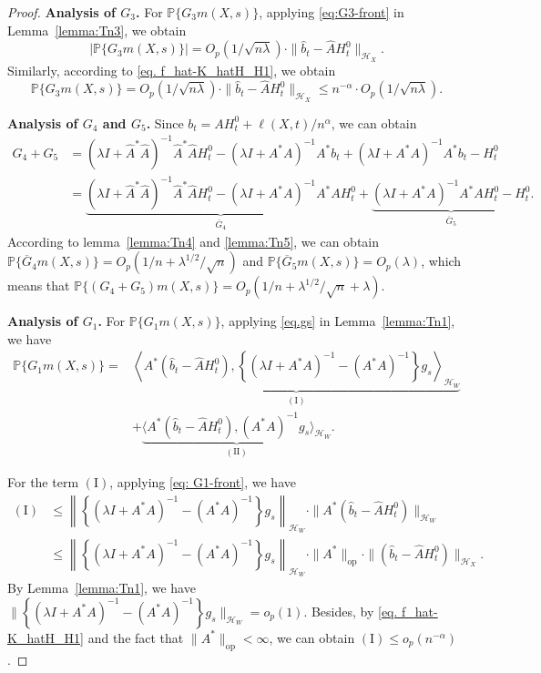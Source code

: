 \documentclass[
  12pt]{article}
\def\mP{\mathbb{P}}
\def\cH{\mathcal{H}}
\begin{document}
\begin{proof}
\textbf{Analysis of $G_3$.} For $\mP\{G_3m(X,s)\}$, applying \eqref{eq:G3-front} in Lemma~\ref{lemma:Tn3}, we obtain
$$
|\mP\{G_3m(X,s)\}|=O_p(1/\sqrt{n\lambda})\cdot \| \widehat{b}_t-\widehat{A}H^0_t\|_{\mathcal{H}_X}.
$$
Similarly, according to \eqref{eq. f_hat-K_hatH_H1}, we obtain
$$
\mP\{G_3m(X,s)\}
= O_p(1/\sqrt{n\lambda})\cdot \| \widehat{b}_t-\widehat{A}H^0_t\|_{\mathcal{H}_X}  \le    n^{-\alpha}\cdot O_p(1/\sqrt{n\lambda}).
$$

\textbf{Analysis of $G_4$ and $G_5$.} Since $b_t=AH^0_t+\ell(X,t)/n^{\alpha}$, we can obtain
\begin{align*}
	G_4+G_5
	&= (\lambda I+\widehat{A}^*\widehat{A})^{-1}\widehat{A}^*\widehat{A}H_{t}^{0}-(\lambda I+A^*A)^{-1}A^*b_t+(\lambda I+A^*A)^{-1}A^*b_t-H_{t}^{0} \\
	&= \underbrace{(\lambda I+\widehat{A}^*\widehat{A})^{-1}\widehat{A}^*\widehat{A}H_{t}^{0}-(\lambda I+A^*A)^{-1}A^*AH_{t}^{0}}_{\overline{G}_4}+ \underbrace{(\lambda I+A^*A)^{-1}A^*AH_{t}^{0}-H_{t}^{0}}_{\overline{G}_5}.
\end{align*}
According to lemma~\ref{lemma:Tn4} and \ref{lemma:Tn5}, we can obtain $\mP\{\overline{G}_4m(X,s)\}=O_{p}(1/n+\lambda^{1/2}/\sqrt{n})$ and $\mP\{\overline{G}_5m(X,s)\}=O_p(\lambda)$, which means that $\mP\{(G_4+G_5)m(X,s)\}=O_{p}(1/n+\lambda^{1/2}/\sqrt{n}+\lambda)$.

\textbf{Analysis of $G_1$.} For $\mP\{G_1m(X,s)\}$, applying \eqref{eq.gs} in Lemma~\ref{lemma:Tn1}, we have
\begin{align*}
	\mP\{G_1m(X,s)\}=& \underbrace{\left\langle A^*(\widehat{b}_t-\widehat{A}H_{t}^{0}),\left\{ (\lambda I+A^*A)^{-1}-(A^*A)^{-1} \right\} g_s \right\rangle_{\cH_W}}_{(\mathrm{I})} \\
    &+ \underbrace{\langle A^*(\widehat{b}_t-\widehat{A}H_{t}^{0}),(A^*A)^{-1}g_s \rangle_{\cH_W}}_{(\mathrm{II})}.
\end{align*}

For the term $\mathrm{(I)}$, applying \eqref{eq: G1-front}, we have
\begin{align*}
    \mathrm{(I)}&\le \left\| \left\{ (\lambda I+A^*A)^{-1}-(A^*A)^{-1} \right\} g_s \right\|_{\mathcal{H}_W} \cdot  \| A^*(\widehat{b}_t-\widehat{A}H^0_t)\|_{\mathcal{H}_W}\\
    & \le \left\| \left\{ (\lambda I+A^*A)^{-1}-(A^*A)^{-1} \right\} g_s \right\|_{\mathcal{H}_W} \cdot  \| A^*\|_{\mathrm{op}}\cdot\|(\widehat{b}_t-\widehat{A}H^0_t)\|_{\mathcal{H}_X}.
\end{align*}
By 
Lemma~\ref{lemma:Tn1}, we have $\| \left\{ (\lambda I+A^*A)^{-1}-(A^*A)^{-1} \right\} g_s \|_{\cH_W}=o_p(1)$. Besides, by \eqref{eq. f_hat-K_hatH_H1} and the fact that $ \| A^*\|_{\mathrm{op}}<\infty$, we can obtain $\mathrm{(I)}\le o_p(n^{-\alpha})$. 


\end{proof}
\end{document}
